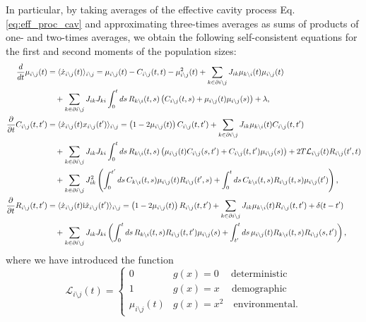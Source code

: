 \documentclass[
    preprint,
    linenumbers,
    amsmath,amssymb,amsfonts,
    aps, physrev,
    superscriptaddress,
    10pt,
    bibnotes
    ]{revtex4-2}
\begin{document}
In particular, by taking averages of the effective cavity process Eq. \eqref{eq:eff_proc_cav} and approximating three-times averages as sums of products of one- and two-times averages, we obtain the following self-consistent equations for the first and second moments of the population sizes:
\begin{align}
  \frac{d}{dt}\mu_{i\setminus j}(t) & = \langle \dot{x}_{i\setminus j}(t) \rangle_{i\setminus j} = \mu_{i\setminus j}(t)-C_{i\setminus j}(t,t)-\mu_{i\setminus j}^2(t)+\sum_{k\in\partial i \setminus j}J_{ik}\mu_{k\setminus i}(t)\mu_{i\setminus j}(t)  \nonumber \\
  & \quad +\sum_{k\in \partial i \setminus j}J_{ik}J_{ki}\int_{0}^{t}ds\, R_{k\setminus i}(t, s)\left(C_{i\setminus j}(t, s)+\mu_{i\setminus j}(t)\mu_{i\setminus j}(s)\right) + \lambda,\\
  \frac{\partial}{\partial t}C_{i\setminus j}(t,t') & = \langle \dot{x}_{i\setminus j}(t) x_{i\setminus j}(t') \rangle_{i\setminus j} = \left(1 - 2 \mu_{i\setminus j}(t) \right) C_{i\setminus j}(t,t') + \sum_{k\in\partial i \setminus j}J_{ik}\mu_{k\setminus i}(t)C_{i\setminus j}(t,t') \nonumber\\
  & \quad + \sum_{k\in \partial i \setminus j}J_{ik}J_{ki}\int_0^t ds\, R_{k\setminus i}(t,s)\left(\mu_{i\setminus j}(t)C_{i\setminus j}(s,t') + C_{i\setminus j}(t,t')\mu_{i\setminus j}(s)\right) + 2T \mathcal{L}_{i\setminus j}(t)R_{i\setminus j}(t',t) \nonumber \\
  & \quad  + \sum_{k\in \partial i \setminus j} J_{ik}^2 \left(\int_0^{t'} ds \, C_{k\setminus i}(t,s) \mu_{i\setminus j}(t) R_{i\setminus j}(t',s) + \int_0^{t} ds \, C_{k\setminus i}(t,s) R_{i\setminus j}(t,s) \mu_{i\setminus j}(t') \right),\\
  \frac{\partial}{\partial t}R_{i\setminus j}(t,t') & =  \langle \dot{x}_{i\setminus j}(t) {\rm i} \hat{x}_{i\setminus j}(t') \rangle_{i\setminus j} = \left(1 - 2 \mu_{i\setminus j}(t) \right) R_{i\setminus j}(t,t') + \sum_{k\in\partial i \setminus j}J_{ik}\mu_{k\setminus i}(t)R_{i\setminus j}(t,t') + \delta(t-t') \nonumber\\
  & \quad + \sum_{k\in \partial i \setminus j} J_{ik}J_{ki} \left( \int_{0}^{t} ds \, R_{k\setminus i}(t,s)R_{i\setminus j}(t,t')\mu_{i\setminus j}(s)+ \int_{t'}^{t} ds \, \mu_{i\setminus j}(t)R_{k\setminus i}(t,s) R_{i\setminus j}(s,t') \right),
\end{align}
where we have introduced the function
\begin{equation}
  \mathcal{L}_{i\setminus j}(t) = \begin{cases}
    0 & g(x) = 0 \quad \ \text{deterministic}\\
    1 & g(x) = x \quad \ \text{demographic}\\
    \mu_{i\setminus j}(t) & g(x) = x^2 \quad \text{environmental}.
  \end{cases}
\end{equation}
\end{document}
